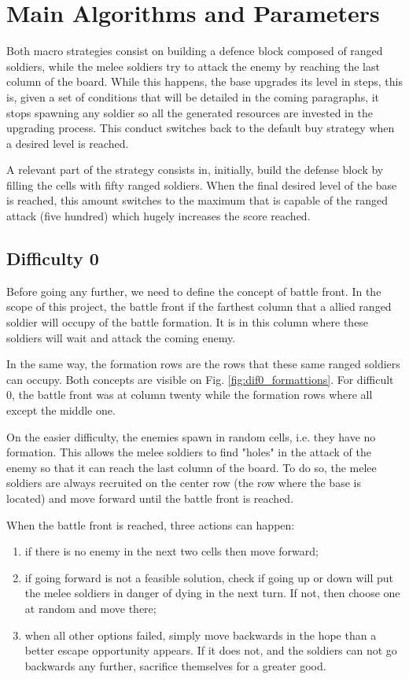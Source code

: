 \documentclass[conference]{IEEEtran}
\begin{document}
\section{Main Algorithms and Parameters}

Both macro strategies consist on building a defence block composed of ranged soldiers, while the melee soldiers try to attack the enemy by reaching the last column of the board. While this happens, the base upgrades its level in steps, this is, given a set of conditions that will be detailed in the coming paragraphs, it stops spawning any soldier so all the generated resources are invested in the upgrading process. This conduct switches back to the default buy strategy when a desired level is reached.

A relevant part of the strategy consists in, initially, build the defense block by filling the cells with fifty ranged soldiers. When the final desired level of the base is reached, this amount switches to the maximum that is capable of the ranged attack (five hundred) which hugely increases the score reached.

\subsection{Difficulty 0}

Before going any further, we need to define the concept of battle front. In the scope of this project, the battle front if the farthest column that a allied ranged soldier will occupy of the battle formation. It is in this column where these soldiers will wait and attack the coming enemy. 

In the same way, the formation rows are the rows that these same ranged soldiers can occupy. Both concepts are visible on Fig. \ref{fig:dif0_formattions}. For difficult 0, the battle front was at column twenty while the formation rows where all except the middle one.

On the easier difficulty, the enemies spawn in random cells, i.e. they have no formation. This allows the melee soldiers to find "holes" in the attack of the enemy so that it can reach the last column of the board. To do so, the melee soldiers are always recruited on the center row (the row where the base is located) and move forward until the battle front is reached.

When the battle front is reached, three actions can happen: 
%
\begin{enumerate}
    \item if there is no enemy in the next two cells then move forward;
    \item if going forward is not a feasible solution, check if going up or down will put the melee soldiers in danger of dying in the next turn. If not, then choose one at random and move there;
    \item when all other options failed, simply move backwards in the hope than a better escape opportunity appears. If it does not, and the soldiers can not go backwards any further, sacrifice themselves for a greater good.
\end{enumerate}
\end{document}
